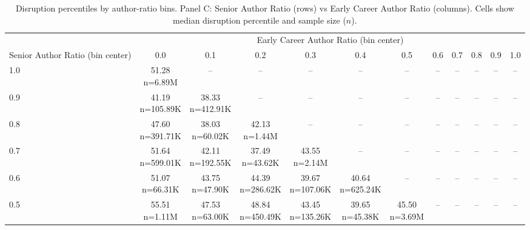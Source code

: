 \begin{table}\centering
            \caption{Disruption percentiles by author-ratio bins. Panel C: Senior Author Ratio (rows) vs Early Career Author Ratio (columns). Cells show median disruption percentile and sample size ($n$).}
            \scriptsize
            \setlength\tabcolsep{4pt}
            \renewcommand{\arraystretch}{1.1}
            \begin{tabular}{lccccccccccc}
            \toprule
            & \multicolumn{11}{c}{Early Career Author Ratio (bin center)} \\
            \cmidrule(lr){2-12}
            Senior Author Ratio (bin center) & 0.0 & 0.1 & 0.2 & 0.3 & 0.4 & 0.5 & 0.6 & 0.7 & 0.8 & 0.9 & 1.0 \\
            \midrule
            1.0 & \makecell{51.28 \\ \scriptsize n=6.89M} & -- & -- & -- & -- & -- & -- & -- & -- & -- & -- \\
0.9 & \makecell{41.19 \\ \scriptsize n=105.89K} & \makecell{38.33 \\ \scriptsize n=412.91K} & -- & -- & -- & -- & -- & -- & -- & -- & -- \\
0.8 & \makecell{47.60 \\ \scriptsize n=391.71K} & \makecell{38.03 \\ \scriptsize n=60.02K} & \makecell{42.13 \\ \scriptsize n=1.44M} & -- & -- & -- & -- & -- & -- & -- & -- \\
0.7 & \makecell{51.64 \\ \scriptsize n=599.01K} & \makecell{42.11 \\ \scriptsize n=192.55K} & \makecell{37.49 \\ \scriptsize n=43.62K} & \makecell{43.55 \\ \scriptsize n=2.14M} & -- & -- & -- & -- & -- & -- & -- \\
0.6 & \makecell{51.07 \\ \scriptsize n=66.31K} & \makecell{43.75 \\ \scriptsize n=47.90K} & \makecell{44.39 \\ \scriptsize n=286.62K} & \makecell{39.67 \\ \scriptsize n=107.06K} & \makecell{40.64 \\ \scriptsize n=625.24K} & -- & -- & -- & -- & -- & -- \\
0.5 & \makecell{55.51 \\ \scriptsize n=1.11M} & \makecell{47.53 \\ \scriptsize n=63.00K} & \makecell{48.84 \\ \scriptsize n=450.49K} & \makecell{43.45 \\ \scriptsize n=135.26K} & \makecell{39.65 \\ \scriptsize n=45.38K} & \makecell{45.50 \\ \scriptsize n=3.69M} & -- & -- & -- & -- & -- \\

\end{tabular}
\end{table}
